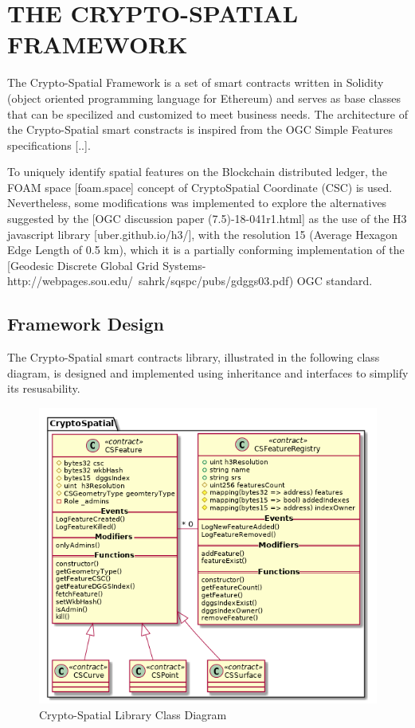 \documentclass{isprs} %
\begin{document}
\newpage

\section{THE CRYPTO-SPATIAL FRAMEWORK}\label{sec:THE CRYPTO-SPATIAL FRAMEWORK}

The Crypto-Spatial Framework is a set of smart contracts written in Solidity (object oriented programming language for Ethereum) and serves as base classes that can be specilized and customized to meet business needs. The architecture of the Crypto-Spatial smart constracts is inspired from the OGC Simple Features specifications [..]. 

To uniquely identify spatial features on the Blockchain distributed ledger, the FOAM space [foam.space] concept of CryptoSpatial Coordinate (CSC) is used. Nevertheless, some modifications was implemented to explore the alternatives suggested by the [OGC discussion paper (7.5)-18-041r1.html] as the use of the H3 javascript library [uber.github.io/h3/], with the resolution 15 (Average Hexagon Edge Length  of 0.5 km), which it is a partially conforming implementation of the [Geodesic Discrete Global Grid Systems-http://webpages.sou.edu/~sahrk/sqspc/pubs/gdggs03.pdf) OGC standard.

\subsection{Framework Design}\label{sec:Framework Design}

The Crypto-Spatial smart contracts library, illustrated in the following class diagram, is designed and implemented using inheritance and interfaces to simplify its resusability.

\begin{figure}[ht!]
\begin{center}
		\includegraphics[width=1.0\columnwidth]{figures/class-crypto-spatial-lib.png}
	\caption{Crypto-Spatial Library Class Diagram}
\label{fig:figure_placement}
\end{center}
\end{figure}
\end{document}

